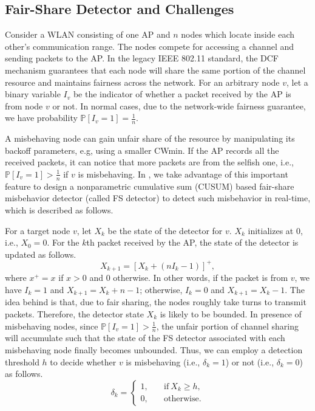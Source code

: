 \documentclass[conference]{IEEEtran}
\begin{document}
\subsection{Fair-Share Detector and Challenges}
Consider a WLAN consisting of one AP and $n$ nodes which locate inside each other's communication range. The nodes compete for accessing a channel and sending packets to the AP. In the legacy IEEE 802.11 standard, the DCF mechanism guarantees that each node will share the same portion of the channel resource and maintains fairness across the network. For an arbitrary node $v$, let a binary variable $I_v$ be the indicator of whether a packet received by the AP is from node $v$ or not. In normal cases, due to the network-wide fairness guarantee, we have probability $\mathbb{P}[I_v=1] = \frac1n$.

A misbehaving node can gain unfair share of the resource by manipulating its backoff parameters, e.g, using a smaller CWmin. If the AP records all the received packets, it can notice that more packets are from the selfish one, i.e., $\mathbb{P}[I_v=1] > \frac1n$ if $v$ is misbehaving. In \cite{tang2014real}, we take advantage of this important feature to design a nonparametric cumulative sum (CUSUM) based fair-share misbehavior detector (called FS detector) to detect such misbehavior in real-time, which is described as follows.

For a target node $v$, let $X_k$ be the state of the detector for $v$. $X_k$ initializes at $0$, i.e., $X_0=0$. For the $k$th packet received by the AP, the state of the detector is updated as follows.
\begin{equation}\label{eq:fsdetector}
    X_{k+1} = \left[X_k+(nI_k-1)\right]^+,
\end{equation}
where $x^+=x$ if $x>0$ and $0$ otherwise. In other words, if the packet is from $v$, we have $I_k=1$ and $X_{k+1} = X_k+n-1$; otherwise, $I_k=0$ and $X_{k+1} = X_k-1$. The idea behind is that, due to fair sharing, the nodes roughly take turns to transmit packets. Therefore, the detector state $X_k$ is likely to be bounded. In presence of misbehaving nodes, since $\mathbb{P}[I_v=1] > \frac1n$, the unfair portion of channel sharing will accumulate such that the state of the FS detector associated with each misbehaving node finally becomes unbounded. Thus, we can employ a detection threshold $h$ to decide whether $v$ is misbehaving (i.e., $\delta_k=1$) or not (i.e., $\delta_k=0$) as follows.
\begin{equation}\label{eq:deltakfs}
    \delta_k = \left\{\begin{array}{ll}
        1, \quad & \textrm{if}~X_k \geq h,\\
        0, \quad & \textrm{otherwise}.
    \end{array}\right.
\end{equation}
\end{document}
